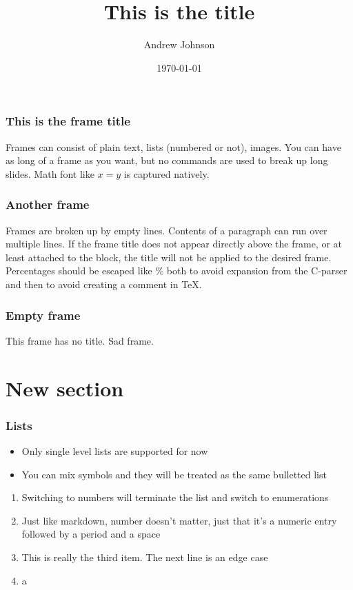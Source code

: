 \documentclass{beamer}
\author{Andrew Johnson}
\date{\today}
\title{This is the title}
\begin{document}
\frame{\titlepage}
\frame{\tableofcontents}

\begin{frame}
\frametitle{This is the frame title}
Frames can consist of plain text, lists (numbered or not), images.
You can have as long of a frame as you want, but no commands
are used to break up long slides.
Math font like $x=y$ is captured natively.
\end{frame}

\begin{frame}
\frametitle{Another frame}
Frames are broken up by empty lines. Contents of a paragraph
can run over multiple lines. If the frame title does not
appear directly above the frame, or at least attached to the block,
the title will not be applied to the desired frame.
Percentages should be escaped like \% both to avoid expansion from the
C-parser and then to avoid creating a comment in TeX.
\end{frame}

\begin{frame}
\frametitle{Empty frame}
\end{frame}

\begin{frame}
This frame has no title.
Sad frame.
\end{frame}

\section{New section}
\frame{\sectionpage}

\begin{frame}
\frametitle{Lists}
\begin{itemize}
\item{Only single level lists are supported for now}
\item{You can mix symbols and they will be treated as the same bulletted list}
\end{itemize}
\begin{enumerate}
\item{Switching to numbers will terminate the list and switch to enumerations}
\item{Just like markdown, number doesn't matter, just that it's a numeric entry followed by a period and a space}
\item{This is really the third item. The next line is an edge case}
\item{a}
\end{enumerate}
\end{frame}
\end{document}
